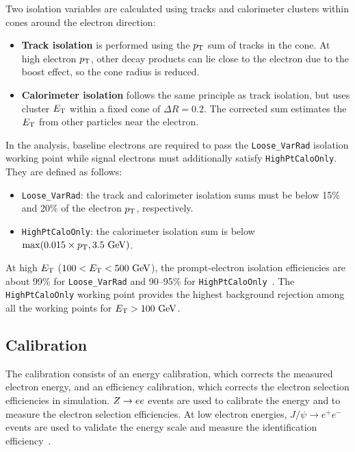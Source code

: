 Two isolation variables are calculated using tracks and calorimeter clusters within cones around the electron direction:
\begin{itemize}
    \item \textbf{Track isolation} is performed using the $p_{\mathrm{T}}$ sum of tracks in the cone. At high electron $p_{\mathrm{T}}$, other decay products can lie close to the electron due to the boost effect, so the cone radius is reduced.
    \item \textbf{Calorimeter isolation} follows the same principle as track isolation, but uses cluster $E_{\mathrm{T}}$ within a fixed cone of $\Delta R=0.2$. The corrected sum estimates the $E_{\mathrm{T}}$ from other particles near the electron.
\end{itemize}
In the analysis, baseline electrons are required to pass the \texttt{Loose\_VarRad} isolation working point while signal electrons must additionally satisfy \texttt{HighPtCaloOnly}. They are defined as follows:
\begin{itemize}
    \item \texttt{Loose\_VarRad}: the track and calorimeter isolation sums must be below 15\% and 20\% of the electron $p_{\mathrm{T}}$, respectively.
    \item \texttt{HighPtCaloOnly}: the calorimeter isolation sum is below $\max(0.015\times p_{\mathrm{T}},3.5~\mathrm{GeV})$.
\end{itemize}
At high $E_{\mathrm{T}}$ ($100<E_{\mathrm{T}}<500~\mathrm{GeV}$), the prompt-electron isolation efficiencies are about 99\% for \texttt{Loose\_VarRad} and 90--95\% for \texttt{HighPtCaloOnly}~\cite{ATLAS2024ElectronPhotonEfficiencies}. The \texttt{HighPtCaloOnly} working point provides the highest background rejection among all the working points for $E_{\mathrm{T}}>100~\mathrm{GeV}$.

\subsection{Calibration}

The calibration consists of an energy calibration, which corrects the measured electron energy, and an efficiency calibration, which corrects the electron selection efficiencies in simulation.
$Z\rightarrow ee$ events are used to calibrate the energy and to measure the electron selection efficiencies.
At low electron energies, $J/\psi\rightarrow e^+e^-$ events are used to validate the energy scale and measure the identification efficiency~\cite{ATLASegammaCalibration2015_2016,ATLAS2024ElectronPhotonEfficiencies}.

